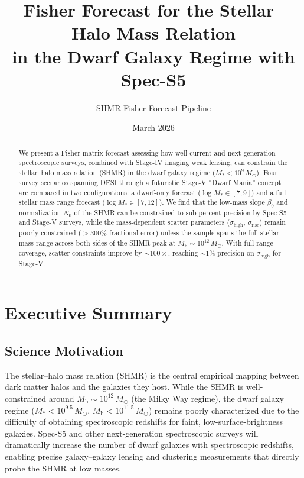 \documentclass[12pt, letterpaper]{article}
\title{Fisher Forecast for the Stellar--Halo Mass Relation\\
in the Dwarf Galaxy Regime with Spec-S5}
\author{SHMR Fisher Forecast Pipeline}
\date{March 2026}
\newcommand{\Msun}{M_\odot}
\newcommand{\Mh}{M_\mathrm{h}}
\newcommand{\Mstar}{M_*}
\begin{document}
\maketitle

\begin{abstract}
We present a Fisher matrix forecast assessing how well current and
next-generation spectroscopic surveys, combined with Stage-IV imaging
weak lensing, can constrain the stellar--halo mass relation (SHMR) in
the dwarf galaxy regime ($\Mstar < 10^{9}\,\Msun$).
Four survey scenarios spanning DESI through a futuristic Stage-V
``Dwarf Mania'' concept are compared in two configurations: a
dwarf-only forecast ($\log\Mstar \in [7, 9]$) and a full stellar mass
range forecast ($\log\Mstar \in [7, 12]$).
We find that the low-mass slope $\beta_0$ and normalization $N_0$ of
the SHMR can be constrained to sub-percent precision by Spec-S5 and
Stage-V surveys, while the mass-dependent scatter parameters
($\sigma_\mathrm{high}$, $\sigma_\mathrm{rise}$) remain poorly
constrained ($>300\%$ fractional error) unless the sample spans the
full stellar mass range across both sides of the SHMR peak at
$\Mh \sim 10^{12}\,\Msun$.
With full-range coverage, scatter constraints improve by
$\sim\!100\times$, reaching $\sim\!1\%$ precision on
$\sigma_\mathrm{high}$ for Stage-V.
\end{abstract}

\tableofcontents
\newpage

\section{Executive Summary}
\label{sec:executive}

\subsection{Science Motivation}

The stellar--halo mass relation (SHMR) is the central empirical
mapping between dark matter halos and the galaxies they host.
While the SHMR is well-constrained around $\Mh \sim 10^{12}\,\Msun$
(the Milky Way regime), the dwarf galaxy regime ($\Mstar < 10^{9.5}\,
\Msun$, $\Mh < 10^{11.5}\,\Msun$) remains poorly characterized due
to the difficulty of obtaining spectroscopic redshifts for faint,
low-surface-brightness galaxies.
Spec-S5 and other next-generation spectroscopic surveys will
dramatically increase the number of dwarf galaxies with
spectroscopic redshifts, enabling precise galaxy--galaxy lensing and
clustering measurements that directly probe the SHMR at low masses.
\end{document}
